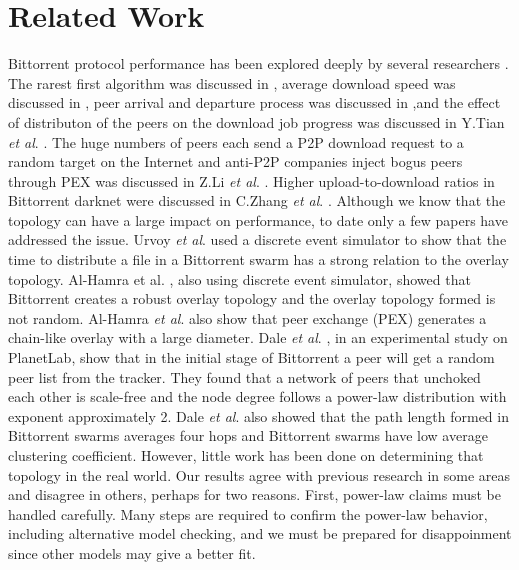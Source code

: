 \documentclass[10pt,conference,letterpaper]{IEEEtran}
\begin{document}
\section{Related Work}\label{relatedworks}
Bittorrent protocol performance has been explored deeply by several researchers \cite{guo2005measurements}\cite{legout2006rarest}\cite{pouwelse2004measurement}\cite{tian2007modeling}.  
The rarest first algorithm was discussed in \cite{legout2006rarest}, average download speed was discussed in \cite{pouwelse2004measurement}, peer arrival and departure process was discussed in \cite{guo2005measurements},and the effect of distributon of the peers on the download job progress was discussed in Y.Tian \textit{et al}. \cite{tian2007modeling}.
The huge numbers of peers each send a P2P download request to a random target on the Internet and anti-P2P companies inject bogus peers through PEX was discussed in Z.Li \textit{et al}. \cite{li2010measurement}.
Higher upload-to-download ratios in  Bittorrent darknet were discussed in C.Zhang \textit{et al}. \cite{zhang2010bittorrent}.
Although we know that the topology can have a large impact on performance, to date only a few papers have addressed the issue.
Urvoy \textit{et al}. \cite{urvoy2007impact} used a discrete event simulator to show that the time to distribute a file in a Bittorrent swarm has a strong relation to the overlay topology.  
Al-Hamra et al. \cite{al2007understanding}, also using discrete event simulator, showed that Bittorrent creates a robust overlay topology and the overlay topology formed is not random. 
Al-Hamra \textit{et al}. \cite{al2007understanding} also show that peer exchange (PEX) generates a chain-like overlay with a large diameter. 
Dale \textit{et al}. \cite{dale2008evolution}, in an experimental study on PlanetLab, show that in the initial stage of Bittorrent a peer will get a random peer list from the tracker. 
They found that a network of peers that unchoked each other is scale-free and the node degree follows a power-law distribution with exponent approximately 2. 
Dale \textit{et al}. \cite{dale2008evolution} also showed that the path length formed in Bittorrent swarms averages four hops and Bittorrent swarms have low average clustering coefficient.  
However, little work has been done on determining that topology in the real world. 
Our results agree with previous research \cite{dale2008evolution} in some areas and disagree in others, perhaps for two reasons.
First, power-law claims must be handled carefully. 
Many steps are required to confirm the power-law behavior, including alternative model checking, and we must be prepared for disappoinment since other models may give a better fit. 
\end{document}
